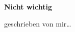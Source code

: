 \begin{titlepage}
    \textbf{\large{Nicht wichtig}}
    
    geschrieben von mir\ldots
\end{titlepage}

